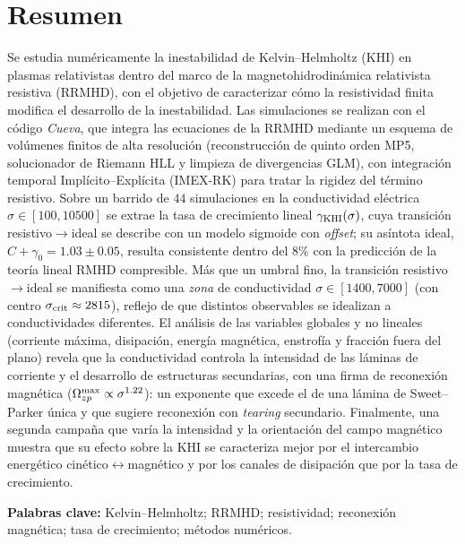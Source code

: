 \chapter*{Resumen}
\primerparrafo Se estudia numéricamente la inestabilidad de Kelvin--Helmholtz (KHI) en plasmas relativistas dentro del marco de la magnetohidrodinámica relativista resistiva (RRMHD), con el objetivo de caracterizar cómo la resistividad finita modifica el desarrollo de la inestabilidad. Las simulaciones se realizan con el código \textit{Cueva}, que integra las ecuaciones de la RRMHD mediante un esquema de volúmenes finitos de alta resolución (reconstrucción de quinto orden MP5, solucionador de Riemann HLL y limpieza de divergencias GLM), con integración temporal Implícito--Explícita (IMEX-RK) para tratar la rigidez del término resistivo. Sobre un barrido de $44$ simulaciones en la conductividad eléctrica $\sigma\in[100,10500]$ se extrae la tasa de crecimiento lineal $\gamma_{\mathrm{KHI}}(\sigma)$, cuya transición resistivo$\to$ideal se describe con un modelo sigmoide con \emph{offset}; su asíntota ideal, $C+\gamma_0=1.03\pm0.05$, resulta consistente dentro del $8\%$ con la predicción de la teoría lineal RMHD compresible. Más que un umbral fino, la transición resistivo$\to$ideal se manifiesta como una \emph{zona} de conductividad $\sigma\in[1400,7000]$ (con centro $\sigma_{\mathrm{crit}}\approx2815$), reflejo de que distintos observables se idealizan a conductividades diferentes. El análisis de las variables globales y no lineales (corriente máxima, disipación, energía magnética, enstrofía y fracción fuera del plano) revela que la conductividad controla la intensidad de las láminas de corriente y el desarrollo de estructuras secundarias, con una firma de reconexión magnética ($\Omega_{zp}^{\max}\propto\sigma^{1.22}$): un exponente que excede el de una lámina de Sweet--Parker única y que sugiere reconexión con \emph{tearing} secundario. Finalmente, una segunda campaña que varía la intensidad y la orientación del campo magnético muestra que su efecto sobre la KHI se caracteriza mejor por el intercambio energético cinético$\leftrightarrow$magnético y por los canales de disipación que por la tasa de crecimiento.

\noindent\textbf{Palabras clave:} Kelvin--Helmholtz; RRMHD; resistividad; reconexión magnética; tasa de crecimiento; métodos numéricos.


\listoffigures

\listoftables

